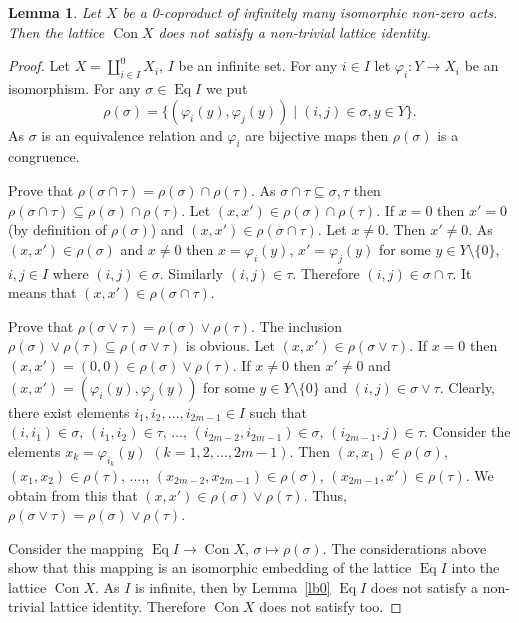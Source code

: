 \documentclass{birkau}
\numberwithin{equation}{section}
\theoremstyle{plain}
\newtheorem{lemma}[theorem]{Lemma}
\theoremstyle{definition}
\DeclareMathOperator{\Con}{Con}
\DeclareMathOperator{\Eq}{Eq}
\begin{document}
	\begin{lemma} \label{lemma:456}
	    Let $X$ be a 0-coproduct of infinitely many isomorphic non-zero acts. Then the lattice $\Con X$ does not satisfy a non-trivial lattice identity.
	\end{lemma}
	\begin{proof}
	    Let $X=\coprod_{i\in I}^0X_i$, $I$ be an infinite set. For any $i \in I$ let $\varphi_i: Y\to X_i$ be an isomorphism. For any $\sigma \in \Eq I$ we put $$ \rho(\sigma)= \{ (\varphi_i(y), \varphi_j(y)) \mid (i,j)\in \sigma, y\in Y \}. $$ As $\sigma$ is an equivalence relation and $\varphi_i$ are bijective maps then $\rho(\sigma)$ is a congruence.

        Prove that $\rho(\sigma \cap \tau) = \rho(\sigma) \cap \rho(\tau)$. As $\sigma \cap \tau \subseteq \sigma, \tau$ then $\rho(\sigma \cap \tau) \subseteq \rho(\sigma) \cap \rho(\tau)$. Let $ (x, x') \in \rho(\sigma) \cap \rho(\tau)$. If $x=0$ then $x'=0$ (by definition of $\rho(\sigma)$) and $ (x, x') \in \rho(\sigma \cap \tau)$. Let $x \ne 0$. Then $x' \ne 0$. As $ (x, x') \in \rho(\sigma)$ and $x \ne 0$ then $x=\varphi_i(y)$, $x'=\varphi_j(y)$ for some $y\in Y \setminus \{0\}$, $i,j \in I$ where $(i, j) \in \sigma$. Similarly $(i, j) \in \tau$. Therefore $(i, j)\in \sigma \cap \tau$. It means that $(x, x') \in \rho(\sigma \cap \tau)$.

        Prove that $\rho(\sigma \vee \tau) = \rho(\sigma) \vee \rho(\tau)$.  The inclusion  $\rho(\sigma) \vee \rho(\tau) \subseteq \rho(\sigma \vee \tau)$ is obvious. Let $(x, x') \in \rho(\sigma \vee \tau)$. If $x=0$ then $(x, x') = (0,0) \in \rho(\sigma) \vee \rho(\tau)$. If $x \ne 0$ then $x' \ne 0$ and $(x, x') =(\varphi_i(y), \varphi_j(y))$ for some $y\in Y \setminus \{ 0\}$ and $(i, j) \in \sigma \vee \tau$. Clearly, there exist elements $i_1, i_2, \ldots, i_{2m-1} \in I$ such that $(i, i_1) \in \sigma, \,(i_1, i_2) \in \tau, \, \ldots, \, (i_{2m-2}, i_{2m-1}) \in \sigma, \, (i_{2m-1}, j) \in \tau$. Consider the elements $x_k=\varphi_{i_k}(y)$ $(k=1,2, \ldots, 2m-1)$. Then $(x, x_1) \in \rho(\sigma)$, $(x_1, x_2) \in \rho(\tau)$, $\ldots$,, $(x_{2m-2}, x_{2m-1}) \in \rho(\sigma)$, $(x_{2m-1}, x') \in \rho(\tau)$. We obtain from this that $(x, x') \in \rho(\sigma) \vee \rho(\tau)$. Thus, $\rho(\sigma \vee \tau) = \rho(\sigma) \vee \rho(\tau)$.

        Consider the mapping $\Eq I \to \Con X$, $\sigma \mapsto \rho(\sigma)$. The considerations above show that this mapping is an isomorphic embedding of the lattice $\Eq I$ into the lattice $\Con X$. As $I$ is infinite, then by Lemma~\ref{lb0} $\Eq I$ does not satisfy a non-trivial lattice identity. Therefore $\Con X$ does not satisfy too.
	\end{proof}
	
\end{document}
